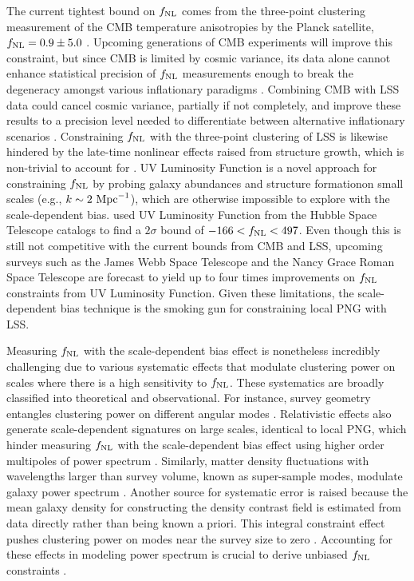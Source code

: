 The current tightest bound on $f_{\rm NL}$ comes from the three-point clustering measurement of the CMB temperature anisotropies by the Planck satellite, $f_{\rm NL}=0.9\pm 5.0$ \citep{akrami2019planck}. Upcoming generations of CMB experiments will improve this constraint, but since CMB is limited by cosmic variance, its data alone cannot enhance statistical precision of $f_{\rm NL}$ measurements enough to break the degeneracy amongst various inflationary paradigms \citep[see, e.g.,][]{ade2019simons}. Combining CMB with LSS data could cancel cosmic variance, partially if not completely, and improve these results to a precision level needed to differentiate between alternative inflationary scenarios \citep[see, e.g.,][]{schmittfull2018PhRvD}. Constraining $f_{\rm NL}$ with the three-point clustering of LSS is likewise hindered by the late-time nonlinear effects raised from structure growth, which is non-trivial to account for \citep{baldauf2011galaxy, baldauf2011primordial}. UV Luminosity Function is a novel approach for constraining $f_{\rm NL}$ by probing galaxy abundances and structure formationon small scales (e.g., $k \sim 2~{\rm Mpc}^{-1}$), which are otherwise impossible to explore with the scale-dependent bias. \cite{sabti2021JCAP} used UV Luminosity Function from the Hubble Space Telescope catalogs \citep{bouwens2015ApJ} to find a $2\sigma$ bound of $-166<f_{\rm NL}<497$. Even though this is still not competitive with the current bounds from CMB and LSS, upcoming surveys such as the James Webb Space Telescope and the Nancy Grace Roman Space Telescope are forecast to yield up to four times improvements on $
f_{\rm NL}$ constraints from UV Luminosity Function. Given these limitations, the scale-dependent bias technique is the smoking gun for constraining local PNG with LSS. 

Measuring $f_{\rm NL}$ with the scale-dependent bias effect is nonetheless incredibly challenging due to various systematic effects that modulate clustering power on scales where there is a high sensitivity to $f_{\rm NL}$. These systematics are broadly classified into theoretical and observational. For instance, survey geometry entangles clustering power on different angular modes \citep{beutler2014clustering,wilson2017rapid}. Relativistic effects also generate scale-dependent signatures on large scales, identical to local PNG, which hinder measuring $f_{\rm NL}$ with the scale-dependent bias effect using higher order multipoles of power spectrum \citep{wang2020}. Similarly, matter density fluctuations with wavelengths larger than survey volume, known as super-sample modes, modulate galaxy power spectrum \citep{castorina2020JCAP}. Another source for systematic error is raised because the mean galaxy density for constructing the density contrast field is estimated from data directly rather than being known a priori. This integral constraint effect pushes clustering power on modes near the survey size to zero \citep{peacock1991large,de2019integral}. Accounting for these effects in modeling power spectrum is crucial to derive unbiased $f_{\rm NL}$ constraints \citep[see, e.g.,][]{riquelme2022primordial}. 

